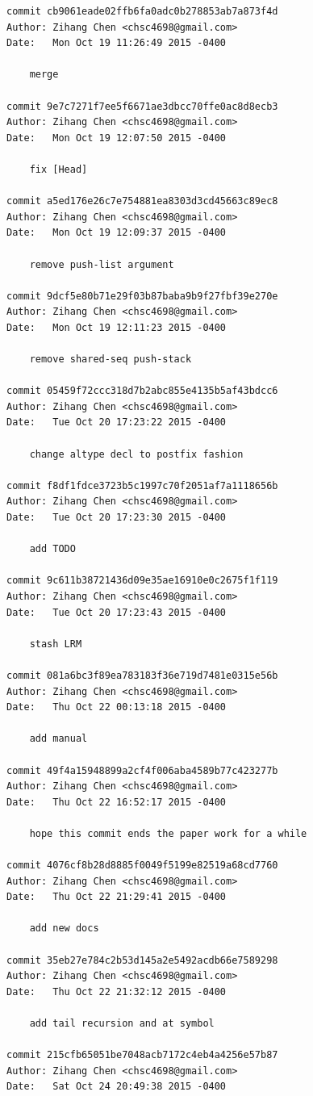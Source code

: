 \documentclass{report}
\begin{document}
\begin{appendices}
\begin{verbatim}
commit cb9061eade02ffb6fa0adc0b278853ab7a873f4d
Author: Zihang Chen <chsc4698@gmail.com>
Date:   Mon Oct 19 11:26:49 2015 -0400

    merge

commit 9e7c7271f7ee5f6671ae3dbcc70ffe0ac8d8ecb3
Author: Zihang Chen <chsc4698@gmail.com>
Date:   Mon Oct 19 12:07:50 2015 -0400

    fix [Head]

commit a5ed176e26c7e754881ea8303d3cd45663c89ec8
Author: Zihang Chen <chsc4698@gmail.com>
Date:   Mon Oct 19 12:09:37 2015 -0400

    remove push-list argument

commit 9dcf5e80b71e29f03b87baba9b9f27fbf39e270e
Author: Zihang Chen <chsc4698@gmail.com>
Date:   Mon Oct 19 12:11:23 2015 -0400

    remove shared-seq push-stack

commit 05459f72ccc318d7b2abc855e4135b5af43bdcc6
Author: Zihang Chen <chsc4698@gmail.com>
Date:   Tue Oct 20 17:23:22 2015 -0400

    change altype decl to postfix fashion

commit f8df1fdce3723b5c1997c70f2051af7a1118656b
Author: Zihang Chen <chsc4698@gmail.com>
Date:   Tue Oct 20 17:23:30 2015 -0400

    add TODO

commit 9c611b38721436d09e35ae16910e0c2675f1f119
Author: Zihang Chen <chsc4698@gmail.com>
Date:   Tue Oct 20 17:23:43 2015 -0400

    stash LRM

commit 081a6bc3f89ea783183f36e719d7481e0315e56b
Author: Zihang Chen <chsc4698@gmail.com>
Date:   Thu Oct 22 00:13:18 2015 -0400

    add manual

commit 49f4a15948899a2cf4f006aba4589b77c423277b
Author: Zihang Chen <chsc4698@gmail.com>
Date:   Thu Oct 22 16:52:17 2015 -0400

    hope this commit ends the paper work for a while

commit 4076cf8b28d8885f0049f5199e82519a68cd7760
Author: Zihang Chen <chsc4698@gmail.com>
Date:   Thu Oct 22 21:29:41 2015 -0400

    add new docs

commit 35eb27e784c2b53d145a2e5492acdb66e7589298
Author: Zihang Chen <chsc4698@gmail.com>
Date:   Thu Oct 22 21:32:12 2015 -0400

    add tail recursion and at symbol

commit 215cfb65051be7048acb7172c4eb4a4256e57b87
Author: Zihang Chen <chsc4698@gmail.com>
Date:   Sat Oct 24 20:49:38 2015 -0400


\end{verbatim}
\end{appendices}
\end{document}
